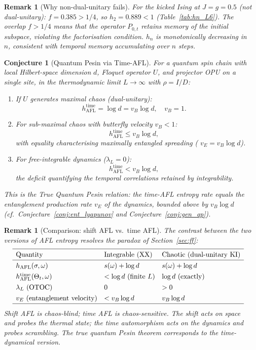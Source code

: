 \documentclass[12pt,a4paper]{article}
\newtheorem{remark}[theorem]{Remark}
\newtheorem{conjecture}[theorem]{Conjecture}
\begin{document}
\begin{remark}[Why non-dual-unitary fails]
For the kicked Ising at $J=g=0.5$ (not dual-unitary): $f=0.385>1/4$, so
$h_2=0.889<1$ (Table~\ref{tab:hn_L6}).  The overlap $f>1/4$ means that
the operator $P_{0,t}$ retains memory of the initial subspace, violating
the factorisation condition.  $h_n$ is monotonically decreasing in $n$,
consistent with temporal memory accumulating over $n$ steps.
\end{remark}

\begin{conjecture}[Quantum Pesin via Time-AFL]
\label{conj:time_afl_pesin}
For a quantum spin chain with local Hilbert-space dimension $d$,
Floquet operator $U$, and projector OPU on a single site, in the
\emph{thermodynamic limit} $L\to\infty$ with $\rho=I/D$:
\begin{enumerate}
\item If $U$ generates \emph{maximal chaos} (dual-unitary):
\[
  h_{\mathrm{AFL}}^{\mathrm{time}} = \log d = v_B\log d,
  \quad v_B=1.
\]
\item For sub-maximal chaos with butterfly velocity $v_B<1$:
\[
  h_{\mathrm{AFL}}^{\mathrm{time}} \leq v_B\log d,
\]
with equality characterising maximally entangled spreading (
$v_E=v_B\log d$).
\item For free-integrable dynamics ($\lambda_L=0$):
\[
  h_{\mathrm{AFL}}^{\mathrm{time}} < v_B\log d,
\]
the deficit quantifying the temporal correlations retained by integrability.
\end{enumerate}
This is the \emph{True Quantum Pesin relation}: the time-AFL entropy rate
equals the entanglement production rate $v_E$ of the dynamics, bounded above
by $v_B\log d$ (cf.\ Conjecture~\ref{conj:ent_lyapunov} and Conjecture~\ref{conj:gen_qp}).
\end{conjecture}

\begin{remark}[Comparison: shift AFL vs.\ time AFL]
\label{rem:shift_vs_time}
The contrast between the two versions of AFL entropy resolves the paradox
of Section~\ref{sec:ff}:
\[
  \renewcommand{\arraystretch}{1.3}
  \begin{array}{lll}
  \hline
  \text{Quantity} & \text{Integrable (XX)} & \text{Chaotic (dual-unitary KI)}\\
  \hline
  h_{\mathrm{AFL}}(\sigma,\omega) & s(\omega)+\log d & s(\omega)+\log d\\
  h_{\mathrm{AFL}}^{\mathrm{time}}(\Theta_t,\omega) & <\log d \text{ (finite }L) & \log d \text{ (exactly)}\\
  \lambda_L\text{ (OTOC)} & 0 & >0\\
  v_E\text{ (entanglement velocity)} & <v_B\log d & v_B\log d\\
  \hline
  \end{array}
\]
\emph{Shift AFL is chaos-blind}; \emph{time AFL is chaos-sensitive}.
The shift acts on space and probes the thermal state; the time automorphism
acts on the dynamics and probes scrambling.  The true quantum Pesin
theorem corresponds to the time-dynamical version.
\end{remark}
\end{document}
